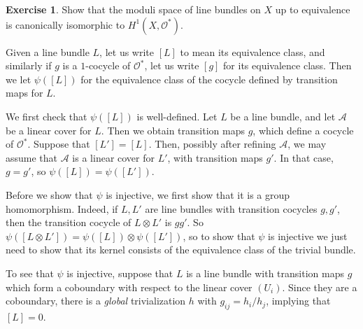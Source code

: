 \documentclass[10pt]{article}
\newcommand{\Olo}{\mathscr O}
\theoremstyle{definition}
\newtheorem{exer}{Exercise}
\begin{document}
\begin{exer}
Show that the moduli space of line bundles on $X$ up to equivalence is canonically isomorphic to $H^1(X, \Olo^*)$.
\end{exer}

Given a line bundle $L$, let us write $[L]$ to mean its equivalence class, and similarly if $g$ is a $1$-cocycle of $\Olo^*$, let us write $[g]$ for its equivalence class.
Then we let $\psi([L])$ for the equivalence class of the cocycle defined by transition maps for $L$.

We first check that $\psi([L])$ is well-defined.
Let $L$ be a line bundle, and let $\mathscr A$ be a linear cover for $L$.
Then we obtain transition maps $g$, which define a cocycle of $\Olo^*$.
Suppose that $[L'] = [L]$. Then, possibly after refining $\mathscr A$, we may assume that $\mathscr A$ is a linear cover for $L'$, with transition maps $g'$.
In that case, $g = g'$, so $\psi([L]) = \psi([L'])$.

Before we show that $\psi$ is injective, we first show that it is a group homomorphism.
Indeed, if $L,L'$ are line bundles with transition cocycles $g,g'$, then the transition cocycle of $L \otimes L'$ is $gg'$.
So $\psi([L \otimes L']) = \psi([L]) \otimes \psi([L'])$, so to show that $\psi$ is injective we just need to show that its kernel consists of the equivalence class of the trivial bundle.

To see that $\psi$ is injective, suppose that $L$ is a line bundle with transition maps $g$ which form a coboundary with respect to the linear cover $(U_i)$.
Since they are a coboundary, there is a \emph{global} trivialization $h$ with $g_{ij} = h_i/h_j$, implying that $[L] = 0$.
\end{document}
